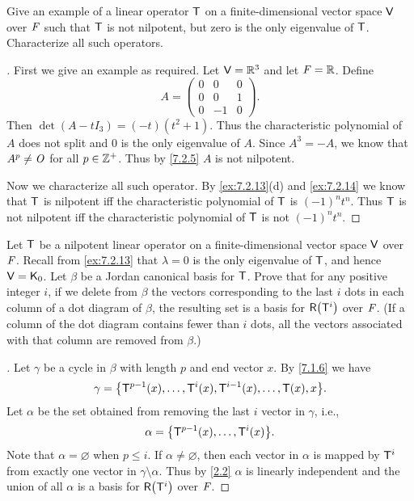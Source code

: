 \begin{ex}\label{ex:7.2.15}
  Give an example of a linear operator \(\mathsf{T}\) on a finite-dimensional vector space \(\mathsf{V}\) over \(\mathit{F}\) such that \(\mathsf{T}\) is not nilpotent, but zero is the only eigenvalue of \(\mathsf{T}\).
  Characterize all such operators.
\end{ex}

\begin{proof}[]
  First we give an example as required.
  Let \(\mathsf{V} = \mathbb{R}^3\) and let \(\mathit{F} = \mathbb{R}\).
  Define
  \[
    A = \begin{pmatrix}
      0 & 0  & 0 \\
      0 & 0  & 1 \\
      0 & -1 & 0
    \end{pmatrix}.
  \]
  Then \(\det(A - t I_3) = (-t)(t^2 + 1)\).
  Thus the characteristic polynomial of \(A\) does not split and \(0\) is the only eigenvalue of \(A\).
  Since \(A^3 = -A\), we know that \(A^p \neq \mathit{O}\) for all \(p \in \mathbb{Z}^+\).
  Thus by \cref{7.2.5} \(A\) is not nilpotent.

  Now we characterize all such operator.
  By \cref{ex:7.2.13}(d) and \cref{ex:7.2.14} we know that \(\mathsf{T}\) is nilpotent iff the characteristic polynomial of \(\mathsf{T}\) is \((-1)^n t^n\).
  Thus \(\mathsf{T}\) is not nilpotent iff the characteristic polynomial of \(\mathsf{T}\) is not \((-1)^n t^n\).
\end{proof}

\begin{ex}\label{ex:7.2.16}
  Let \(\mathsf{T}\) be a nilpotent linear operator on a finite-dimensional vector space \(\mathsf{V}\) over \(\mathit{F}\).
  Recall from \cref{ex:7.2.13} that \(\lambda = 0\) is the only eigenvalue of \(\mathsf{T}\), and hence \(\mathsf{V} = \mathsf{K}_0\).
  Let \(\beta\) be a Jordan canonical basis for \(\mathsf{T}\).
  Prove that for any positive integer \(i\), if we delete from \(\beta\) the vectors corresponding to the last \(i\) dots in each column of a dot diagram of \(\beta\), the resulting set is a basis for \(\rg{\T^i}\) over \(\mathit{F}\).
  (If a column of the dot diagram contains fewer than \(i\) dots, all the vectors associated with that column are removed from \(\beta\).)
\end{ex}

\begin{proof}[]
  Let \(\gamma\) be a cycle in \(\beta\) with length \(p\) and end vector \(x\).
  By \cref{7.1.6} we have
  \[
    \gamma = \set{\T^{p - 1}(x), \dots, \T^i(x), \T^{i - 1}(x), \dots, \T(x), x}.
  \]
  Let \(\alpha\) be the set obtained from removing the last \(i\) vector in \(\gamma\), i.e.,
  \[
    \alpha = \set{\T^{p - 1}(x), \dots, \T^i(x)}.
  \]
  Note that \(\alpha = \varnothing\) when \(p \leq i\).
  If \(\alpha \neq \varnothing\), then each vector in \(\alpha\) is mapped by \(\mathsf{T}^i\) from exactly one vector in \(\gamma \setminus \alpha\).
  Thus by \cref{2.2} \(\alpha\) is linearly independent and the union of all \(\alpha\) is a basis for \(\rg{\T^i}\) over \(\mathit{F}\).
\end{proof}

\begin{ex}\label{ex:7.2.20}
\end{ex}

\begin{ex}\label{ex:7.2.21}
\end{ex}

